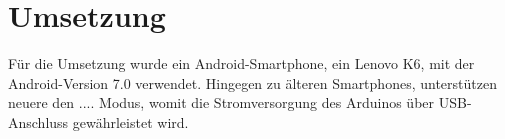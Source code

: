 \section{Umsetzung}
Für die Umsetzung wurde ein Android-Smartphone, ein Lenovo K6, mit der Android-Version 7.0 verwendet.
Hingegen zu älteren Smartphones, unterstützen neuere den .... Modus, womit die Stromversorgung des Arduinos über USB-Anschluss gewährleistet wird.

